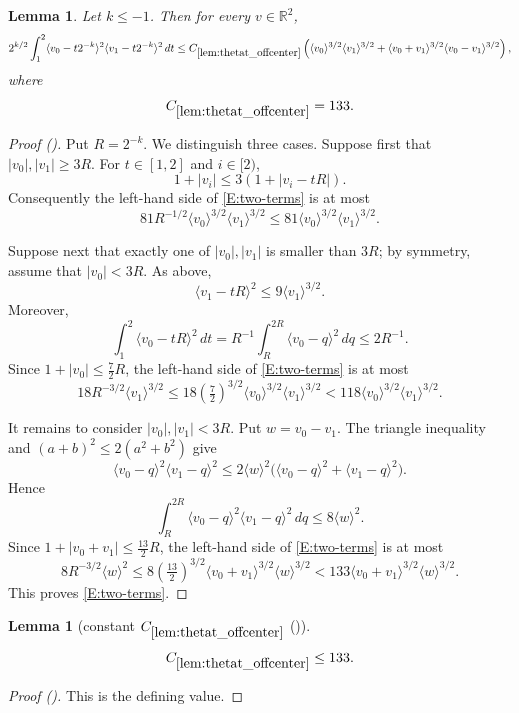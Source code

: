 \documentclass[12pt,reqno]{amsart}
\newcommand{\auto}{{({\tiny\faCar})}}
\theoremstyle{plain}
\newtheorem{lemma}[theorem]{Lemma}
\numberwithin{equation}{section}
\theoremstyle{remark}
\newcommand{\R}{{\mathbb R}}
\begin{document}
\begin{lemma}\label{lem:thetat_offcenter}
Let $k\le-1$. Then for every $v\in\R^2$,
\begin{equation}\label{E:two-terms}
2^{k/2}\int_1^2
\langle v_0-t2^{-k}\rangle^2
\langle v_1-t2^{-k}\rangle^2\,dt
\le C_{\ref{lem:thetat_offcenter}}
\left(
\langle v_0\rangle^{3/2}\langle v_1\rangle^{3/2}
+
\langle v_0+v_1\rangle^{3/2}\langle v_0-v_1\rangle^{3/2}
\right),
\end{equation}
where
\begin{equation}\label{off center bump constant}
C_{\ref{lem:thetat_offcenter}}=133.
\end{equation}
\end{lemma}
\begin{proof}[Proof \auto]
Put $R=2^{-k}$. We distinguish three cases. 
Suppose first that $|v_0|,|v_1|\ge3R$. For $t\in[1,2]$ and $i\in[2)$,
\[
1+|v_i|\le3(1+|v_i-tR|).
\]
Consequently the left-hand side of \eqref{E:two-terms} is at most
\[
81R^{-1/2}\langle v_0\rangle^{3/2}\langle v_1\rangle^{3/2}
\le81\langle v_0\rangle^{3/2}\langle v_1\rangle^{3/2}.
\]

Suppose next that exactly one of $|v_0|,|v_1|$ is smaller than $3R$; by symmetry, assume that $|v_0|<3R$. As above,
\[
\langle v_1-tR\rangle^2\le9\langle v_1\rangle^{3/2}.
\]
Moreover,
\[
\int_1^2\langle v_0-tR\rangle^2\,dt
=R^{-1}\int_R^{2R}\langle v_0-q\rangle^2\,dq
\le2R^{-1}.
\]
Since $1+|v_0|\le\frac72R$, the left-hand side of \eqref{E:two-terms} is at most
\[
18R^{-3/2}\langle v_1\rangle^{3/2}
\le18\left(\tfrac72\right)^{3/2}
\langle v_0\rangle^{3/2}\langle v_1\rangle^{3/2}
<118\langle v_0\rangle^{3/2}\langle v_1\rangle^{3/2}.
\]

It remains to consider $|v_0|,|v_1|<3R$. Put $w=v_0-v_1$. The triangle inequality and $(a+b)^2\le2(a^2+b^2)$ give
\[
\langle v_0-q\rangle^2\langle v_1-q\rangle^2
\le2\langle w\rangle^2
\bigl(\langle v_0-q\rangle^2+\langle v_1-q\rangle^2\bigr).
\]
Hence
\[
\int_R^{2R}\langle v_0-q\rangle^2\langle v_1-q\rangle^2\,dq
\le8\langle w\rangle^2.
\]
Since $1+|v_0+v_1|\le\frac{13}{2}R$, the left-hand side of \eqref{E:two-terms} is at most
\[
8R^{-3/2}\langle w\rangle^2
\le8\left(\tfrac{13}{2}\right)^{3/2}
\langle v_0+v_1\rangle^{3/2}\langle w\rangle^{3/2}
<133\langle v_0+v_1\rangle^{3/2}\langle w\rangle^{3/2}.
\]
This proves \eqref{E:two-terms}.
\end{proof}

\begin{lemma}[constant $C_{\ref{lem:thetat_offcenter}}$ \auto]\label{constant off center bump}
\begin{equation}\label{constant off center bump bound}
C_{\ref{lem:thetat_offcenter}}\le133.
\end{equation}
\end{lemma}
\begin{proof}[Proof \auto]
This is the defining value.
\end{proof}
\end{document}

